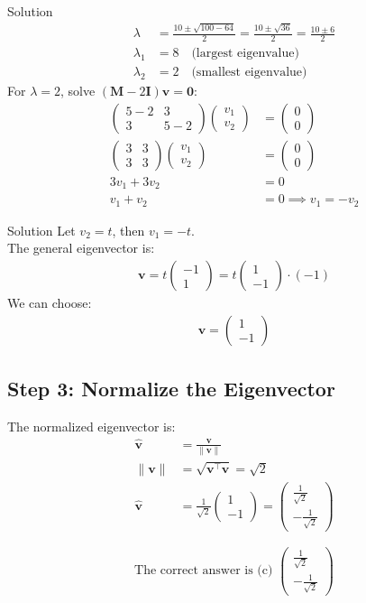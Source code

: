\documentclass{beamer}
\newcommand{\myvec}[1]{\ensuremath{\begin{pmatrix}#1\end{pmatrix}}}
\begin{document}
	\begin{frame}{Solution}
		\begin{align}
			\lambda &= \frac{10 \pm \sqrt{100 - 64}}{2} = \frac{10 \pm \sqrt{36}}{2} = \frac{10 \pm 6}{2}\\
			\lambda_1 &=  8 \quad \text{(largest eigenvalue)}\\
			\lambda_2 &=  2 \quad \text{(smallest eigenvalue)}
		\end{align}
			For $\lambda = 2$, solve $(\mathbf{M} - 2\mathbf{I})\mathbf{v} = \mathbf{0}$:
		\begin{align}
			\myvec{5-2 & 3\\3 & 5-2}\myvec{v_1\\v_2} &= \myvec{0\\0}\\
			\myvec{3 & 3\\3 & 3}\myvec{v_1\\v_2} &= \myvec{0\\0}\\
			3v_1 + 3v_2 &= 0\\
			v_1 + v_2 &= 0 \implies v_1 = -v_2
		\end{align}
	\end{frame}

\begin{frame}{Solution}
	Let $v_2 = t$, then $v_1 = -t$.\\
The general eigenvector is:
\begin{align}
	\mathbf{v} = t\myvec{-1\\1} = t\myvec{1\\-1} \cdot (-1)
\end{align}
We can choose:
\begin{align}
	\mathbf{v} = \myvec{1\\-1}
\end{align}

\subsection*{Step 3: Normalize the Eigenvector}

The normalized eigenvector is:
\begin{align}
	\hat{\mathbf{v}} &= \frac{\mathbf{v}}{\|\mathbf{v}\|}\\
	\|\mathbf{v}\| &= \sqrt{\mathbf{v}^\top \mathbf{v}}= \sqrt{2}\\
	\hat{\mathbf{v}} &= \frac{1}{\sqrt{2}}\myvec{1\\-1} = \myvec{\frac{1}{\sqrt{2}} \\ -\frac{1}{\sqrt{2}}}
\end{align}

\end{frame}
$$\boxed{\text{The correct answer is (c) } \myvec{\frac{1}{\sqrt{2}} \\ -\frac{1}{\sqrt{2}}}}$$	
\end{document}
